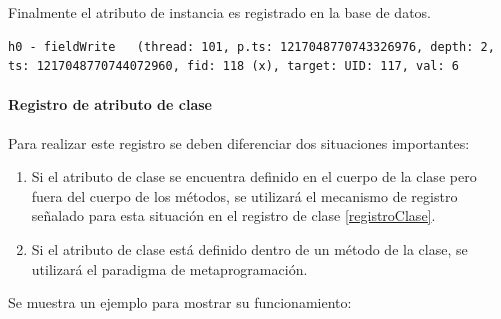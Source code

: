 \documentclass[12pt,legalpaper]{report}
\begin{document}
Finalmente el atributo de instancia es registrado en la base de datos.

\begin{singlespace}
\begin{lstlisting}[style=consola,numbers=none]
h0 - fieldWrite   (thread: 101, p.ts: 1217048770743326976, depth: 2, ts: 1217048770744072960, fid: 118 (x), target: UID: 117, val: 6
\end{lstlisting}
\end{singlespace}


				\paragraph{Registro de atributo de clase\label{registerStaticField}}

Para realizar este registro se deben diferenciar dos situaciones importantes:
\begin{enumerate}
	\item Si el atributo de clase se encuentra definido en el cuerpo de la clase pero fuera del cuerpo de los métodos, se utilizará el mecanismo de registro señalado para esta situación en el registro de clase \ref{registroClase}.
	\item Si el atributo de clase está definido dentro de un método de la clase, se utilizará el paradigma de metaprogramación.
\end{enumerate}

Se muestra un ejemplo para mostrar su funcionamiento:
\end{document}
